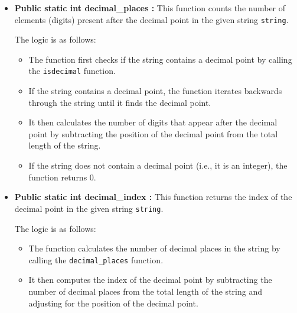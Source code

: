 \documentclass{article}
\begin{document}
\begin{itemize}
The logic is as follows:
\begin{itemize}
    \item The function first removes the leading zeroes by calling the \texttt{remove\_leading\_zeroes} method.
    \item After removing the leading zeroes, it then removes the trailing zeroes by calling the \texttt{remove\_trailing\_zeroes} method.
    \item This ensures that the string is left with only significant digits, with no unnecessary zeroes at either end.\\
\end{itemize}

\item \textbf{Public static int decimal\_places :} 
This function counts the number of elements (digits) present after the decimal point in the given string \texttt{string}.

The logic is as follows:
\begin{itemize}
    \item The function first checks if the string contains a decimal point by calling the \texttt{isdecimal} function.
    \item If the string contains a decimal point, the function iterates backwards through the string until it finds the decimal point.
    \item It then calculates the number of digits that appear after the decimal point by subtracting the position of the decimal point from the total length of the string.
    \item If the string does not contain a decimal point (i.e., it is an integer), the function returns 0.\\
\end{itemize}

\item \textbf{Public static int decimal\_index :} 
This function returns the index of the decimal point in the given string \texttt{string}.

The logic is as follows:
\begin{itemize}
    \item The function calculates the number of decimal places in the string by calling the \texttt{decimal\_places} function.
    \item It then computes the index of the decimal point by subtracting the number of decimal places from the total length of the string and adjusting for the position of the decimal point.\\
\end{itemize}


\end{itemize}
\end{document}
